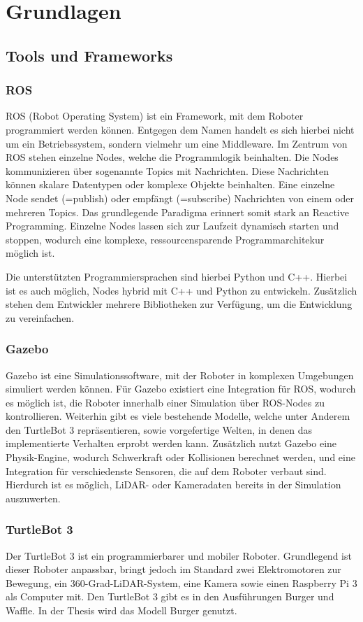 \chapter{Grundlagen}
\section{Tools und Frameworks}
\subsection{ROS}
ROS (Robot Operating System) ist ein Framework, mit dem Roboter programmiert werden können. Entgegen dem Namen handelt es sich hierbei nicht um ein Betriebssystem, sondern vielmehr
um eine Middleware. Im Zentrum von ROS stehen einzelne Nodes, welche die Programmlogik beinhalten. Die Nodes kommunizieren über sogenannte Topics mit Nachrichten. Diese Nachrichten
können skalare Datentypen oder komplexe Objekte beinhalten. Eine einzelne Node sendet (=publish) oder empfängt (=subscribe) Nachrichten von einem oder mehreren Topics. Das grundlegende
Paradigma erinnert somit stark an Reactive Programming. Einzelne Nodes lassen sich zur Laufzeit dynamisch starten und stoppen, wodurch eine komplexe, ressourcensparende Programmarchitekur möglich ist.

Die unterstützten Programmiersprachen sind hierbei Python und C++. Hierbei ist es auch möglich, Nodes hybrid mit C++ und Python zu entwickeln. Zusätzlich stehen dem Entwickler mehrere
Bibliotheken zur Verfügung, um die Entwicklung zu vereinfachen. \cite{ROS}

\subsection{Gazebo}
Gazebo ist eine Simulationssoftware, mit der Roboter in komplexen Umgebungen simuliert werden können. Für Gazebo existiert eine Integration für ROS, wodurch es möglich ist,
die Roboter innerhalb einer Simulation über ROS-Nodes zu kontrollieren. Weiterhin gibt es viele bestehende Modelle, welche unter Anderem den TurtleBot 3 repräsentieren, sowie 
vorgefertige Welten, in denen das implementierte Verhalten erprobt werden kann.
Zusätzlich nutzt Gazebo eine Physik-Engine, wodurch Schwerkraft oder Kollisionen berechnet werden, und eine Integration für verschiedenste Sensoren, die auf dem Roboter verbaut sind.
Hierdurch ist es möglich, LiDAR- oder Kameradaten bereits in der Simulation auszuwerten. \cite{Gazebo}

\subsection{TurtleBot 3}
Der TurtleBot 3 ist ein programmierbarer und mobiler Roboter. Grundlegend ist dieser Roboter anpassbar, bringt jedoch im Standard zwei Elektromotoren zur Bewegung, ein 360-Grad-LiDAR-System,
eine Kamera sowie einen Raspberry Pi 3 als Computer mit. Den TurtleBot 3 gibt es in den Ausführungen Burger und Waffle. In der Thesis wird das Modell Burger genutzt. \cite{TurtleBot3}

